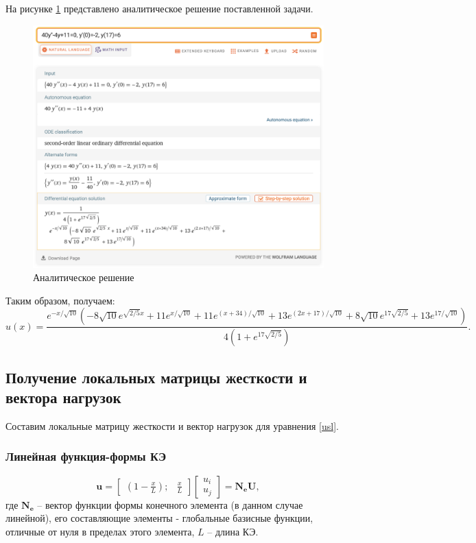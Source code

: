 На рисунке \ref{analit} представлено аналитическое решение поставленной задачи.
\begin{figure}[!h]
\begin{center}
\includegraphics[scale = 0.5]{labs/img/img1}
\end{center}
\caption{Аналитическое решение}
\label{analit}
\end{figure}

Таким образом, получаем:
$$
u(x)=\frac{e^{-x / \sqrt{10}}\left(-8 \sqrt{10} e^{\sqrt{2 / 5} x}+11 e^{x / \sqrt{10}}+11 e^{(x+34) / \sqrt{10}}+13 e^{(2 x+17) / \sqrt{10}}+ 8 \sqrt{10} e^{17 \sqrt{2 / 5}}+13 e^{17 / \sqrt{10}}\right)}{4\left(1+e^{17 \sqrt{2 / 5}}\right)}.
$$


\subsection{Получение локальных матрицы жесткости и вектора нагрузок}

Составим локальные матрицу жесткости и вектор нагрузок для уравнения \ref{usl}.

\subsubsection{Линейная функция-формы КЭ}

$$
\mathbf{u}=\begin{bmatrix}
(1-\frac{x}{L}) ; & \frac{x}{L}
\end{bmatrix}
\begin{bmatrix}
u_i \\
u_j
\end{bmatrix}
=\mathbf{N_eU},
$$
где $\mathbf{N_e}$ -- вектор функции формы конечного элемента (в данном случае линейной), его составляющие элементы - глобальные базисные функции, отличные от нуля в пределах этого элемента, $L$ -- длина КЭ.

